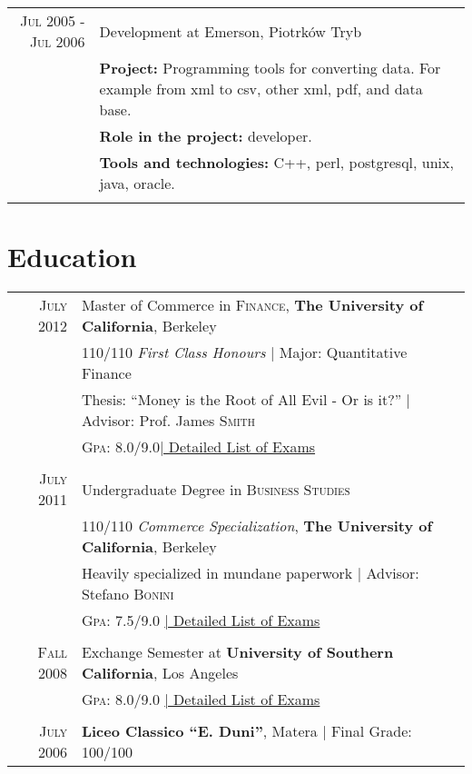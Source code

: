 \documentclass[a4paper,9pt]{article} %
\begin{document}
\begin{longtable}{r|p{11cm}}
\textsc{Jul 2005 - Jul 2006} & Development at Emerson, Piotrków Tryb\\
& \textbf{Project:} Programming tools for converting data. For example from xml to csv, other xml, pdf, and data base.\\
& \textbf{Role in the project:} developer.\\
& \textbf{Tools and technologies:} C++, perl, postgresql, unix, java, oracle.\\
\multicolumn{2}{c}{} \\

\end{longtable}



\section{Education}

\begin{longtable}{rl}	
\textsc{July} 2012 & Master of Commerce in \textsc{Finance}, \textbf{The University of California}, Berkeley\\
& 110/110 \small\emph{First Class Honours} | Major: Quantitative Finance\\
& Thesis: ``Money is the Root of All Evil - Or is it?'' | \small Advisor: Prof. James \textsc{Smith}\\
&\normalsize \textsc{Gpa}: 8.0/9.0\hyperlink{grds}{\hfill | \footnotesize Detailed List of Exams}\\
&\\


\textsc{July} 2011& Undergraduate Degree in \textsc{}\textsc{Business Studies} \\&110/110 \small\emph{Commerce Specialization}, \normalsize\textbf{The University of California}, Berkeley\\
& Heavily specialized in mundane paperwork | \small Advisor: Stefano \textsc{Bonini}\\
&\normalsize \textsc{Gpa}: 7.5/9.0 \hyperlink{grds_usc}{\hfill| \footnotesize Detailed List of Exams}\\
&\\


\textsc{Fall} 2008 & Exchange Semester at \textbf{University of Southern California}, Los Angeles\\
& \textsc{Gpa}: 8.0/9.0 \hyperlink{grds_usc}{\hfill| \footnotesize Detailed List of Exams}\\
&\\


\textsc{July} 2006& \textbf{Liceo Classico ``E. Duni''}, Matera | Final Grade: 100/100
\end{longtable}
\end{document}
